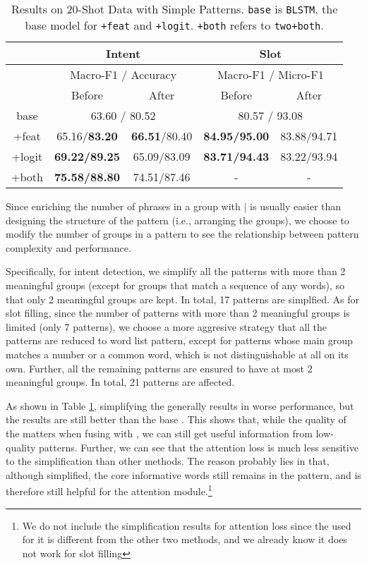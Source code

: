 \begin{table}
\setlength{\tabcolsep}{0.23em}
\centering
\small{
\begin{tabular}{|c|c|c|c|c|}

\hline
  & \multicolumn{2}{|c|}{Intent} & \multicolumn{2}{|c|}{Slot}  \\
\hline
  & \multicolumn{2}{|c|}{Macro-F1 / Accuracy} & \multicolumn{2}{|c|}{Macro-F1 / Micro-F1}  \\
\hline
  & Before & After & Before & After \\
\hline
base & \multicolumn{2}{|c|}{63.60 / 80.52} & \multicolumn{2}{|c|}{80.57 / 93.08}  \\
\hline
+feat & 65.16/\textbf{83.20} & \textbf{66.51}/80.40 & \textbf{84.95/95.00} & 83.88/94.71 \\
\hline
+logit & \textbf{69.22/89.25} & 65.09/83.09 & \textbf{83.71/94.43} & 83.22/93.94  \\
\hline
+both & \textbf{75.58/88.80} & 74.51/87.46 & - & - \\
\hline 
\end{tabular}
}
\caption{Results on 20-Shot Data with Simple Patterns. \texttt{base} is \texttt{BLSTM}, the base model for \texttt{+feat} and \texttt{+logit}. \texttt{+both} refers to \texttt{two+both}.}
\label{tab_simple}
\end{table}

Since enriching the number of phrases in a group with $|$ is usually easier than designing the structure of the pattern (i.e., arranging the groups), we choose to modify the number of groups in a pattern to see the relationship between pattern complexity and performance.

Specifically, for intent detection, we simplify all the patterns with more than 2 meaningful groups (except for groups that match a sequence of any words), so that only 2 meaningful groups are kept. In total, 17 patterns are simplfied. 
As for slot filling, since the number of patterns with more than 2 meaningful groups is limited (only 7 patterns), we choose a more aggresive strategy that all the patterns are reduced to word list pattern, except for patterns whose main group matches a number or a common word, which is not distinguishable at all on its own. Further, all the remaining patterns are ensured to have at most 2 meaningful groups. In total, 21 patterns are affected.

As shown in Table \ref{tab_simple}, simplifying the \RE generally results in worse performance, but the results are still better than the base \BLSTM. This shows that, while the quality of the \RE matters when fusing with \NN, we can still get useful information from low-quality patterns. Further, we can see that the attention loss is much less sensitive to the simplification than other methods. The reason probably lies in that, although simplified, the core informative words still remains in the pattern, and is therefore still helpful for the attention module.\footnote{We do not include the simplification results for attention loss since the \RE used for it is different from the other two methods, and we already know it does not work for slot filling} 






